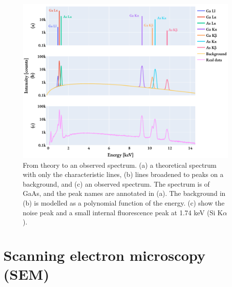 \begin{figure}[hbtp]
    \centering
    \includegraphics[width=0.99\linewidth]{figures/eds_theoretical2realSpectrum.pdf}
    \caption{
        From theory to an observed spectrum.
        (a) a theoretical spectrum with only the characteristic lines, (b) lines broadened to peaks on a background, and (c) an observed spectrum.
        The spectrum is of GaAs, and the peak names are annotated in (a).
        The background in (b) is modelled as a polynomial function of the energy.
        (c) show the noise peak and a small internal fluorescence peak at 1.74 keV (Si K$\alpha$).
    }
    \label{fig:eds_theoretical2realSpectrum}

\end{figure}


%



























\clearpage

\section{Scanning electron microscopy (SEM)}
\label{theory:sem}

